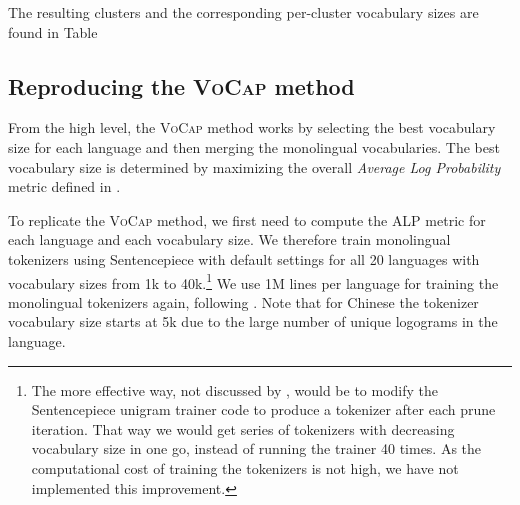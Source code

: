 The resulting clusters and the corresponding per-cluster vocabulary sizes are found in Table 

\subsection{Reproducing the \textsc{VoCap} method}



From the high level, the \textsc{VoCap} method works by selecting the best vocabulary size for each language and then merging the monolingual vocabularies. The best vocabulary size is determined by maximizing the overall \textit{Average Log Probability} metric defined in . 

To replicate the \textsc{VoCap} method, we first need to compute the \textsc{ALP} metric for each language and each vocabulary size. We therefore train monolingual tokenizers using Sentencepiece with default settings for all 20 languages with vocabulary sizes from 1k to 40k.\footnote{The more effective way, not discussed by \citet{zheng_allocating_2021}, would be to modify the Sentencepiece unigram trainer code to produce a tokenizer after each prune iteration. That way we would get series of tokenizers with decreasing vocabulary size in one go, instead of running the trainer 40 times. As the computational cost of training the tokenizers is not high, we have not implemented this improvement.} We use 1M lines per language for training the monolingual tokenizers again, following \citet{zheng_allocating_2021}. Note that for Chinese the tokenizer vocabulary size starts at 5k due to the large number of unique logograms in the language. 


